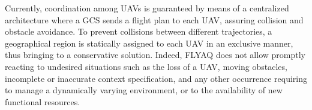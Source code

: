\documentclass[letterpaper, 10 pt, conference]{ieeeconf}
\begin{document}
%
%
Currently, coordination among UAVs is guaranteed by means of a centralized architecture where a GCS sends a flight plan to each UAV, assuring collision and obstacle avoidance. 
To prevent collisions between different trajectories, a geographical region is statically assigned to each UAV in an exclusive manner, thus bringing to a conservative solution.
Indeed, FLYAQ does not allow promptly reacting to undesired situations such as the loss of a UAV, moving obstacles, incomplete or inaccurate context specification, and any other occurrence requiring to manage a dynamically varying environment, or to the availability of new functional resources.

%
%
\end{document}

